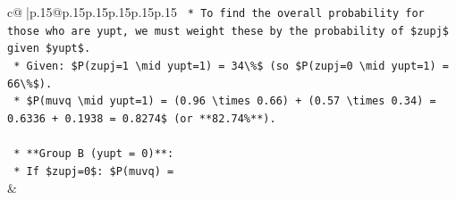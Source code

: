 \documentclass{article}
\begin{document}
{\begin{supertabular}{c@{$\;$}|p{.15\linewidth}@{}p{.15\linewidth}p{.15\linewidth}p{.15\linewidth}p{.15\linewidth}p{.15\linewidth}}
{{{\texttt{        *   To find the overall probability for those who are yupt, we must weight these by the probability of \$zupj\$ given \$yupt\$.} \\
\texttt{        *   Given: \$P(zupj=1 \textbackslash{}mid yupt=1) = 34\textbackslash{}\%\$ (so \$P(zupj=0 \textbackslash{}mid yupt=1) = 66\textbackslash{}\%\$).} \\
\texttt{        *   \$P(muvq \textbackslash{}mid yupt=1) = (0.96 \textbackslash{}times 0.66) + (0.57 \textbackslash{}times 0.34) = 0.6336 + 0.1938 = 0.8274\$ (or **82.74\%**).} \\
\\ 
\texttt{    *   **Group B (yupt = 0)**:} \\
\texttt{        *   If \$zupj=0\$: \$P(muvq) =} \\
            }
        }
    }
    & \\ \\


\end{supertabular}}
\end{document}
